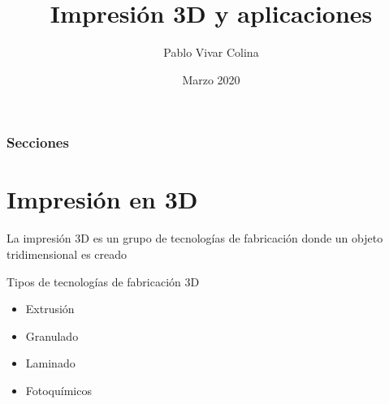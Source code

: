 \documentclass{beamer}
\title[Impresión 3D]{Impresión 3D y aplicaciones} %
\author{Pablo Vivar Colina} %
\institute[UNAM] %
{
Facultad de Ingeniería de la Universidad Nacional Autónoma de México \\ %
\medskip
\textit{pvivar@idea161.org} %
}
\date{Marzo 2020}
\begin{document}
\begin{frame}
\titlepage %
\end{frame}

\begin{frame}
\frametitle{Secciones} %
\tableofcontents %
\end{frame}






\section{Impresión en 3D}

\begin{frame}

  \begin{block}{}
      La impresión 3D es un grupo de tecnologías de fabricación donde un objeto tridimensional es creado 
  \end{block}

\begin{block}{Tipos de tecnologías de fabricación 3D}
	
	\begin{itemize}
		\item Extrusión
		\item Granulado
		\item Laminado
		\item Fotoquímicos
	\end{itemize}
	
\end{block}

	
\end{frame}
\end{document}
